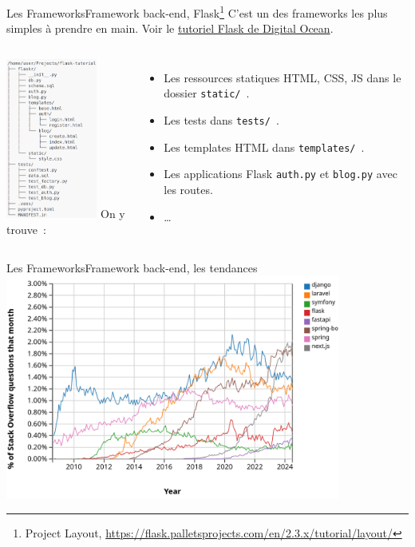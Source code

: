 \documentclass{beamer}
\begin{document}
    \begin{frame}{Les Frameworks}{Framework back-end, Flask\footnote{Project Layout, \url{https://flask.palletsprojects.com/en/2.3.x/tutorial/layout/}}}
        C'est un des frameworks les plus simples à prendre en main.
        Voir le \href{https://www.digitalocean.com/community/tutorials/how-to-make-a-web-application-using-flask-in-python-3}{tutoriel Flask de Digital Ocean}.
        \bigbreak
        \begin{columns}
            \centering
            \includegraphics[width=3cm]{image/flask-project-structure}
            On y trouve~:
            \begin{itemize}
                \item Les ressources statiques HTML, CSS, JS dans le dossier \lstinline{static/}~.
                \item Les tests dans \lstinline{tests/}~.
                \item Les templates HTML dans \lstinline{templates/}~.
                \item Les applications Flask \lstinline{auth.py} et \lstinline{blog.py} avec les routes.
                \item \ldots
            \end{itemize}
        \end{columns}
    \end{frame}
    
    \begin{frame}{Les Frameworks}{Framework back-end, les tendances}
        \centering
        \includegraphics[width=11cm]{image/back-end-trends}
    \end{frame}
    
\end{document}
